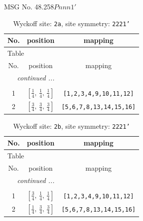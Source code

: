 \documentclass[fleqn,8pt]{jsarticle}
\begin{document}
\setcounter{MaxMatrixCols}{32}

\renewcommand{\tablename}{Table~}
\renewcommand{\figurename}{Figure~}
\begin{center}
\LARGE
MSG No. 48.258\quad$Pnnn1'$
\end{center}
\renewcommand{\arraystretch}{1.2}
\begin{longtable}{ccc}
\caption{Wyckoff site: {\tt 2a}, site symmetry: {\tt 2221'}}
 \\
 \hline \hline
No. & position & mapping \\ \hline \endfirsthead

\multicolumn{2}{l}{\tablename\ \thetable{}} \\
 \hline \hline
No. & position & mapping \\ \hline \endhead

 \hline \hline
\multicolumn{2}{r}{\footnotesize\it continued ...} \\ \endfoot

 \hline \hline
\multicolumn{2}{r}{} \\ \endlastfoot

1 & $\left[ \frac{1}{4},\, \frac{1}{4},\, \frac{1}{4} \right]$ & {\tt [1,2,3,4,9,10,11,12]} \\ \hline
2 & $\left[ \frac{3}{4},\, \frac{3}{4},\, \frac{3}{4} \right]$ & {\tt [5,6,7,8,13,14,15,16]} \\
\end{longtable}
\renewcommand{\arraystretch}{1.2}
\begin{longtable}{ccc}
\caption{Wyckoff site: {\tt 2b}, site symmetry: {\tt 2221'}}
 \\
 \hline \hline
No. & position & mapping \\ \hline \endfirsthead

\multicolumn{2}{l}{\tablename\ \thetable{}} \\
 \hline \hline
No. & position & mapping \\ \hline \endhead

 \hline \hline
\multicolumn{2}{r}{\footnotesize\it continued ...} \\ \endfoot

 \hline \hline
\multicolumn{2}{r}{} \\ \endlastfoot

1 & $\left[ \frac{3}{4},\, \frac{1}{4},\, \frac{1}{4} \right]$ & {\tt [1,2,3,4,9,10,11,12]} \\ \hline
2 & $\left[ \frac{1}{4},\, \frac{3}{4},\, \frac{3}{4} \right]$ & {\tt [5,6,7,8,13,14,15,16]} \\
\end{longtable}
\end{document}
